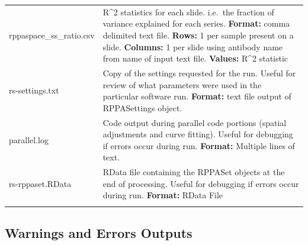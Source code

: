 \documentclass[
]{article}
\begin{document}
\begin{longtable}[]{@{}ll@{}}
\begin{minipage}[t]{0.42\columnwidth}\raggedright
rppaspace\_ss\_ratio.csv\strut
\end{minipage} & \begin{minipage}[t]{0.52\columnwidth}\raggedright
R\^{}2 statistics for each slide. i.e.~the fraction of variance
explained for each series. \textbf{Format:} comma delimited text file.
\textbf{Rows:} 1 per sample present on a slide. \textbf{Columns:} 1 per
slide using antibody name from name of input text file. \textbf{Values:}
R\^{}2 statistic\strut
\end{minipage}\tabularnewline
\begin{minipage}[t]{0.42\columnwidth}\raggedright
rs-settings.txt\strut
\end{minipage} & \begin{minipage}[t]{0.52\columnwidth}\raggedright
Copy of the settings requested for the run. Useful for review of what
parameters were used in the particular software run. \textbf{Format:}
text file output of RPPASettings object.\strut
\end{minipage}\tabularnewline
\begin{minipage}[t]{0.42\columnwidth}\raggedright
parallel.log\strut
\end{minipage} & \begin{minipage}[t]{0.52\columnwidth}\raggedright
Code output during parallel code portions (spatial adjustments and curve
fitting). Useful for debugging if errors occur during run.
\textbf{Format:} Multiple lines of text.\strut
\end{minipage}\tabularnewline
\begin{minipage}[t]{0.42\columnwidth}\raggedright
rs-rppaset.RData\strut
\end{minipage} & \begin{minipage}[t]{0.52\columnwidth}\raggedright
RData file containing the RPPASet objects at the end of processing.
Useful for debugging if errors occur during run. \textbf{Format:} RData
File\strut
\end{minipage}\tabularnewline
\begin{minipage}[t]{0.42\columnwidth}\raggedright
\strut
\end{minipage} & \begin{minipage}[t]{0.52\columnwidth}\raggedright
\strut
\end{minipage}\tabularnewline
\bottomrule
\end{longtable}

\hypertarget{warnings-and-errors-outputs}{%
\subsection{Warnings and Errors
Outputs}\label{warnings-and-errors-outputs}}
\end{document}
